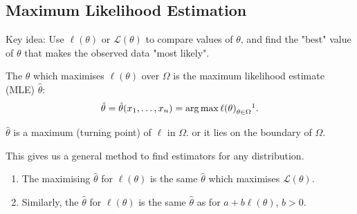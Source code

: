 \documentclass[10pt, a4paper]{article}
\begin{document}
\subsection{Maximum Likelihood Estimation}
Key idea:
Use $\ell(\theta)$ or $\mathcal{L}(\theta)$ to compare values of $\theta$,
and find the "best" value of $\theta$ that makes the observed data "most likely".

\begin{definition}
    The $\theta$ which maximises $\ell(\theta)$ over $\Omega$ is the maximum likelihood estimate
    (MLE)
    $\hat{\theta}$:
    \[
    \hat{\theta} = \hat{\theta}(x_1, \dotsc, x_n) = \argmax{\ell(\theta)}_{\theta \in \Omega}\footnotemark.
    \]
\end{definition}

$\hat{\theta}$ is a maximum
(turning point)
of $\ell$ in $\Omega$.
or it lies on the boundary of $\Omega$.

This gives us a general method to find estimators for any distribution.

\begin{proposition}\phantom{}
    \begin{enumerate}[label = (\roman*)]
        \item The maximising $\hat{\theta}$ for $\ell(\theta)$ is the same $\hat{\theta}$ which maximises $\mathcal{L}(\theta)$.

        \item Similarly,
        the $\hat{\theta}$ for $\ell(\theta)$ is the same $\hat{\theta}$ as for $a + b\ell(\theta)$,
        $b > 0$.
    \end{enumerate}
\end{proposition}
\end{document}
